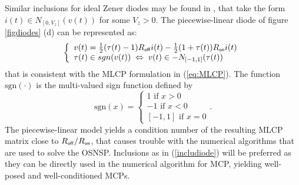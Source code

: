 Similar inclusions for ideal Zener diodes may be found in \cite{acary-brogliato2008,addi2009}, that take the form $i(t) \in N_{[0,V_{z}]}(v(t))$ for some $V_{z} >0$. The piecewise-linear  diode of figure \ref{figdiodes} (d) can be represented as:
\begin{equation}\label{includiode2}
\left\{\begin{array}{l}
v(t)=\frac{1}{2}(\tau(t)-1) R_\off i(t) -\frac{1}{2}(1+\tau(t)) R_\on i(t) \\
 \tau(t) \in \mbox{sgn}(v(t))\; \Leftrightarrow \; v(t) \in - N_{[-1,1]}(\tau(t))
\end{array}\right.
\end{equation}
that is consistent with the MLCP formulation in (\ref{eq:MLCP}). The function $\mbox{sgn}(\cdot)$ is the multi-valued sign function defined by
\begin{equation}
  \label{eq:sgn}
  \mbox{sgn}(x) =
  \begin{cases}
    1 \text{ if } x >0 \\
    -1 \text{ if } x <0 \\
    [-1,1] \text{ if } x =0
  \end{cases}.
\end{equation}
The piecewise-linear model yields a condition number of the resulting MLCP matrix close to $R_\off/R_\on$, that causes trouble with the numerical algorithms that are used to solve the OSNSP. Inclusions as in (\ref{includiode}) will be preferred as they can be directly used in the numerical algorithm for MCP, yielding well-posed and well-conditioned MCPs. 



